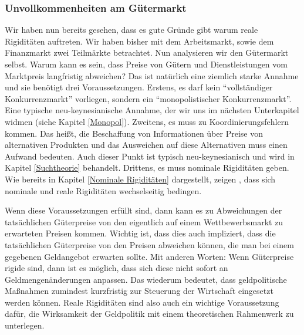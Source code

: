 \subsubsection{Unvollkommenheiten am Gütermarkt}
Wir haben nun bereits gesehen, dass es gute Gründe gibt warum reale Rigiditäten auftreten. Wir haben bisher mit dem Arbeitsmarkt, sowie dem Finanzmarkt zwei Teilmärkte betrachtet. Nun analysieren wir den Gütermarkt selbst. Warum kann es sein, dass Preise von Gütern und Dienstleistungen vom Marktpreis langfristig abweichen? Das ist natürlich eine ziemlich starke Annahme und sie benötigt drei Voraussetzungen. Erstens, es darf kein "`vollständiger Konkurrenzmarkt"' vorliegen, sondern ein "`monopolistischer Konkurrenzmarkt"'. Eine typische neu-keynesianische Annahme, der wir uns im nächsten Unterkapitel widmen (siehe Kapitel \ref{Monopol}). Zweitens, es muss zu Koordinierungsfehlern kommen. Das heißt, die Beschaffung von Informationen über Preise von alternativen Produkten und das Ausweichen auf diese Alternativen muss einen Aufwand bedeuten. Auch dieser Punkt ist typisch neu-keynesianisch und wird in Kapitel \ref{Suchtheorie} behandelt. Drittens, es muss nominale Rigiditäten geben. Wie bereits in Kapitel \ref{Nominale Rigiditäten} dargestellt, zeigen \textcite{RomerDavid1990}, dass sich nominale und reale Rigiditäten wechselseitig bedingen. 

Wenn diese Voraussetzungen erfüllt sind, dann kann es zu Abweichungen der tatsächlichen Güterpreise von den eigentlich auf einem Wettbewerbsmarkt zu erwarteten Preisen kommen. Wichtig ist, dass dies auch impliziert, dass die tatsächlichen Güterpreise von den Preisen abweichen können, die man bei einem gegebenen Geldangebot erwarten sollte. Mit anderen Worten: Wenn Güterpreise rigide sind, dann ist es möglich, dass sich diese nicht sofort an Geldmengenänderungen anpassen. Das wiederum bedeutet, dass geldpolitische Maßnahmen zumindest kurzfristig zur Steuerung der Wirtschaft eingesetzt werden können. Reale Rigiditäten sind also auch ein wichtige Voraussetzung dafür, die Wirksamkeit der Geldpolitik mit einem theoretischen Rahmenwerk zu unterlegen. 

